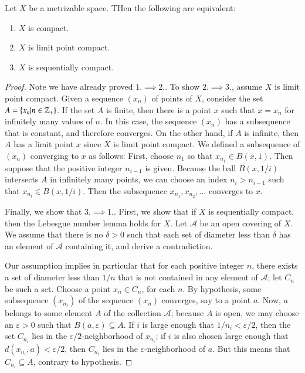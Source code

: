\documentclass[12pt, a4paper, oneside, openright, titlepage]{book}
\begin{document}
\begin{thm}
    Let $X$ be a metrizable space. THen the following are equivalent: \begin{enumerate}
        \item $X$ is compact.
        \item $X$ is limit point compact.
        \item $X$ is sequentially compact.
    \end{enumerate}
\end{thm}
\begin{proof}
    Note we have already proved $1.\implies 2.$. To show $2.\implies 3.$, assume $X$ is limit point compact. Given a sequence $(x_n)$ of points of $X$, consider the set $A = \{x_n\vert n \in \mathbb Z_+\}$. If the set $A$ is finite, then there is a point $x$ such that $x = x_n$ for infinitely many values of $n$. In this case, the sequence $(x_n)$ has a subsequence that is constant, and therefore converges. On the other hand, if $A$ is infinite, then $A$ has a limit point $x$ since $X$ is limit point compact. We defined a subsequence of $(x_n)$ converging to $x$ as follows: First, choose $n_1$ so that $x_{n_1} \in B(x,1)$. Then suppose that the positive integer $n_{i-1}$ is given. Because the ball $B(x,1/i)$ intersects $A$ in infinitely many points, we can choose an index $n_i > n_{i-1}$ such that $x_{n_i} \in B(x,1/i)$. Then the subsequence $x_{n_1},x_{n_2},...$ converges to $x$.


    Finally, we show that $3.\implies 1.$. First, we show that if $X$ is sequentially compact, then the Lebesgue number lemma holds for $X$. Let $\mathcal{A}$ be an open covering of $X$. We assume that there is no $\delta > 0$ such that each set of diameter less than $\delta$ has an element of $\mathcal{A}$ containing it, and derive a contradiction.


    Our assumption implies in particular that for each positive integer $n$, there exists a set of diameter less than $1/n$ that is not contained in any element of $\mathcal{A}$; let $C_n$ be such a set. Choose a point $x_n \in C_n$, for each $n$. By hypothesis, some subsequence $(x_{n_i})$ of the sequence $(x_n)$ converges, say to a point $a$. Now, $a$ belongs to some element $A$ of the collection $\mathcal{A}$; because $A$ is open, we may choose an $\varepsilon > 0$ such that $B(a,\varepsilon) \subseteq A$. If $i$ is large enough that $1/n_i < \varepsilon/2$, then the set $C_{n_i}$ lies in the $\varepsilon/2$-neighborhood of $x_{n_i}$; if $i$ is also chosen large enough that $d(x_{n_i},a) < \varepsilon/2$, then $C_{n_i}$ lies in the $\varepsilon$-neighborhood of $a$. But this means that $C_{n_i} \subseteq A$, contrary to hypothesis. 



\end{proof}
\end{document}
